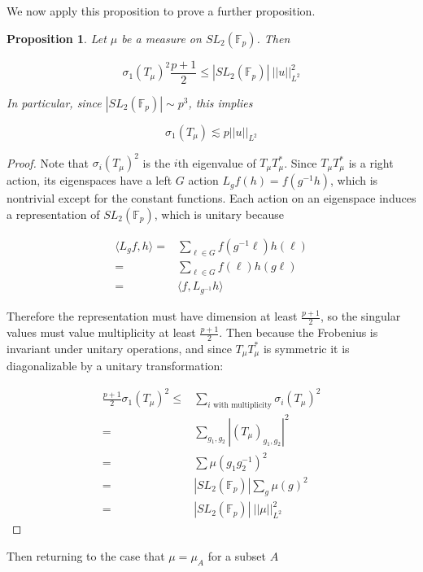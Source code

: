 \documentclass[12pt]{amsart}
\newtheorem{prop}[theorem]{Proposition}
\begin{document}
We now apply this proposition to prove a further proposition. 

\begin{prop}
Let $\mu$ be a measure on $SL_2(\mathbb{F}_p)$. Then 

\[\sigma_1(T_\mu)^2 \frac{p+1}{2} \leq |SL_2(\mathbb{F}_p)| \ || u||_{L^2}^2\] 

In particular, since $|SL_2(\mathbb{F}_p)| \sim p^3$, this implies 

\[\sigma_1(T_\mu) \lesssim p || u||_{L^2}\] 

\label{sig_one_Tmu_bound}
\end{prop}

\begin{proof}
Note that $\sigma_i(T_\mu)^2$ is the $i$th eigenvalue of $T_\mu T_\mu^*$. Since $T_\mu T_\mu^*$ is a right action, its eigenspaces have a left $G$ action $L_g f(h) = f(g^{-1}h)$, which is nontrivial except for the constant functions. Each action on an eigenspace induces a representation of $SL_2(\mathbb{F}_p)$, which is unitary because 

\begin{align*}
    \langle L_g f, h \rangle =& \sum_{\ell \in G} f(g^{-1} \ell) h(\ell)\\
    =& \sum_{\ell \in G} f( \ell) h(g\ell)\\
    = & \langle f, L_{g^{-1} }h \rangle 
\end{align*}

Therefore the representation must have dimension at least $ \frac{p+1}{2} $, so the singular values must value multiplicity at least $\frac{p+1}{2} $. Then because the Frobenius is invariant under unitary operations, and since $T_\mu T_\mu^*$ is symmetric it is diagonalizable by a unitary transformation:

\begin{align*}
    \frac{p+1}{2} \sigma_1(T_\mu)^2 \leq &  \sum_{i\text{ with multiplicity}}  \sigma_i(T_\mu)^2\\
    = & \sum_{g_1, g_2} |(T_\mu)_{g_1, g_2}|^2 \\
    = & \sum \mu(g_1 g_2^{-1})^2 \\
    =& |SL_2(\mathbb{F}_p)| \sum_g \mu(g)^2 \\
    =& |SL_2(\mathbb{F}_p)| \ ||\mu||_{L^2}^2
\end{align*}


\end{proof}

Then returning to the case that $\mu = \mu_A$ for a subset $A$
\end{document}
